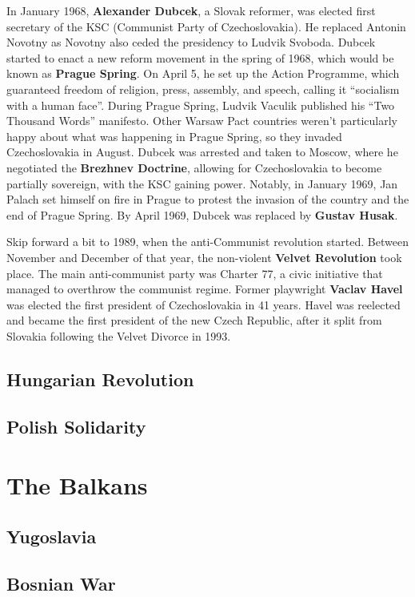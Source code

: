 In January 1968, \textbf{Alexander Dubcek}, a Slovak reformer,
was elected first secretary of the KSC (Communist Party of Czechoslovakia).
He replaced Antonin Novotny as Novotny also ceded the presidency to Ludvik Svoboda.
Dubcek started to enact a new reform movement in the spring of 1968, which would be known as \textbf{Prague Spring}.
On April 5, he set up the Action Programme, which guaranteed freedom of religion, press, assembly, and speech,
calling it ``socialism with a human face''.
During Prague Spring, Ludvik Vaculik published his ``Two Thousand Words'' manifesto.
Other Warsaw Pact countries weren't particularly happy about what was happening in Prague Spring,
so they invaded Czechoslovakia in August.
Dubcek was arrested and taken to Moscow, where he negotiated the \textbf{Brezhnev Doctrine},
allowing for Czechoslovakia to become partially sovereign, with the KSC gaining power.
Notably, in January 1969,
Jan Palach set himself on fire in Prague to protest the invasion of the country and the end of Prague Spring.
By April 1969, Dubcek was replaced by \textbf{Gustav Husak}.

Skip forward a bit to 1989, when the anti-Communist revolution started.
Between November and December of that year, the non-violent \textbf{Velvet Revolution} took place.
The main anti-communist party was Charter 77, a civic initiative that managed to overthrow the communist regime.
Former playwright \textbf{Vaclav Havel} was elected the first president of Czechoslovakia in 41 years.
Havel was reelected and became the first president of the new Czech Republic,
after it split from Slovakia following the Velvet Divorce in 1993.

\subsection*{Hungarian Revolution}

\subsection*{Polish Solidarity}

\section{The Balkans}

\subsection*{Yugoslavia}

\subsection*{Bosnian War}

